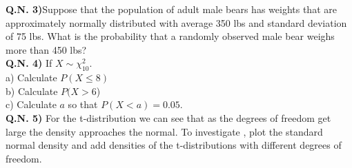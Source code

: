 \documentclass[twoside,11pt,,a4paper]{report}
\begin{document}
\noindent \textbf{ Q.N. 3)}Suppose that the population of adult male bears has weights that are approximately normally distributed with average 350 lbs and standard deviation of 75 lbs. What is the probability that a randomly observed male bear weighs more than 450 lbs?\\



\noindent \textbf{ Q.N. 4)} If $X\sim\chi^2_{10}$.\\
a) Calculate $P(X\leq 8)$\\
b) Calculate $P(X>6$)\\
c) Calculate $a$ so that $P(X<a)=0.05.$\\


\noindent \textbf{ Q.N. 5)} For the t-distribution we can see that as the degrees of freedom get large the density approaches the normal. To investigate , plot the standard normal density and add densities of  the t-distributions with different degrees of freedom.
\end{document}
